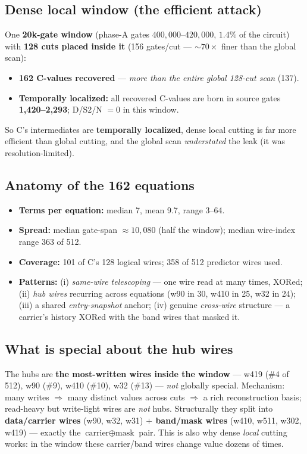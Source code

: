 \documentclass[11pt]{article}
\newcommand{\xor}{\oplus}
\begin{document}
\subsection{Dense local window (the efficient attack)}

One \textbf{20k-gate window} (phase-A gates $400{,}000$--$420{,}000$, $1.4\%$ of the
circuit) with \textbf{128 cuts placed inside it} (156 gates/cut --- $\sim\!70\times$
finer than the global scan):
\begin{itemize}
\item \textbf{162 C-values recovered} --- \emph{more than the entire global 128-cut
scan} (137).
\item \textbf{Temporally localized:} all recovered C-values are born in source gates
\textbf{1{,}420--2{,}293}; D/S2/N $=0$ in this window.
\end{itemize}
So C's intermediates are \textbf{temporally localized}, dense local cutting is far
more efficient than global cutting, and the global scan \emph{understated} the leak
(it was resolution-limited).

\subsection{Anatomy of the 162 equations}
\begin{itemize}
\item \textbf{Terms per equation:} median 7, mean 9.7, range 3--64.
\item \textbf{Spread:} median gate-span $\approx 10{,}080$ (half the window); median
wire-index range 363 of 512.
\item \textbf{Coverage:} 101 of C's 128 logical wires; 358 of 512 predictor wires used.
\item \textbf{Patterns:} (i) \emph{same-wire telescoping} --- one wire read at many
times, XORed; (ii) \emph{hub wires} recurring across equations (w90 in 30, w410 in 25,
w32 in 24); (iii) a shared \emph{entry-snapshot} anchor; (iv) genuine \emph{cross-wire}
structure --- a carrier's history XORed with the band wires that masked it.
\end{itemize}

\subsection{What is special about the hub wires}

The hubs are \textbf{the most-written wires inside the window} --- w419 (\#4 of 512),
w90 (\#9), w410 (\#10), w32 (\#13) --- \emph{not} globally special. Mechanism: many
writes $\Rightarrow$ many distinct values across cuts $\Rightarrow$ a rich
reconstruction basis; read-heavy but write-light wires are \emph{not} hubs.
Structurally they split into \textbf{data/carrier wires} (w90, w32, w31)
\textbf{$+$ band/mask wires} (w410, w511, w302, w419) --- exactly the
$\text{carrier}\xor\text{mask}$ pair. This is also why dense \emph{local} cutting
works: in the window these carrier/band wires change value dozens of times.
\end{document}
